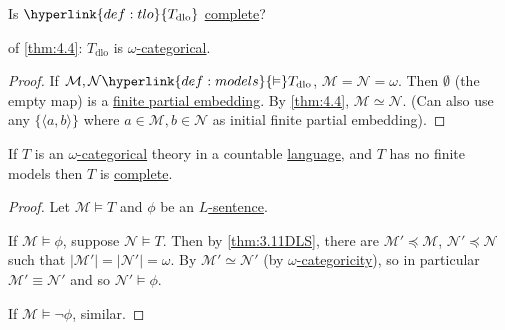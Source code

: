 \documentclass{article}
\let\models\vDash
\newcommand{\named}[1]{\textbf{#1}\index{#1}}
\begin{document}
Is $\hyperlink{def:tlo}{T_{\text{dlo}}}$ \hyperlink{def:complete}{complete}?

\begin{ncor}\label{cor:4.7}
  of \cref{thm:4.4}: \hyperlink{def:tlo}{$T_{\text{dlo}}$} is \hyperlink{def:wcat}{$\omega$-categorical}.
\end{ncor}
\begin{proof}
  If $\mathcal{M},\mathcal{N} \hyperlink{def:models}{\models} T_{\text{dlo}}$, $\mathcal{M} = \mathcal{N} = \omega$.
  Then $\emptyset$ (the empty map) is a \hyperlink{def:pe}{finite partial embedding}.
  By \cref{thm:4.4}, $\mathcal{M} \simeq \mathcal{N}$.
  (Can also use any $\{\langle a, b \rangle\}$ where $a \in \mathcal{M}, b \in \mathcal{N}$ as initial finite partial embedding).
\end{proof}
\begin{nthm}\label{thm:4.8}
  If $T$ is an \hyperlink{def:wcat}{$\omega$-categorical} theory in a countable \hyperlink{def:lang}{language}, and $T$ has no finite models then $T$ is \hyperlink{def:complete}{complete}.
\end{nthm}
\begin{proof}
  Let $\mathcal{M} \models T$ and $\phi$ be an \hyperlink{def:sentence}{$L$-sentence}.

  If $\mathcal{M} \models \phi$, suppose $\mathcal{N} \models T$.
  Then by \cref{thm:3.11DLS}, there are $\mathcal{M}' \preccurlyeq \mathcal{M}$, $\mathcal{N}' \preccurlyeq \mathcal{N}$ such that $|\mathcal{M}'| = |\mathcal{N}'| = \omega$.
  By $\mathcal{M}' \simeq \mathcal{N}'$ (by \hyperlink{def:wcat}{$\omega$-categoricity}), so in particular $\mathcal{M}' \equiv \mathcal{N}'$ and so $\mathcal{N}' \models \phi$.

  If $\mathcal{M} \models \lnot \phi$, similar.
\end{proof}
\end{document}
